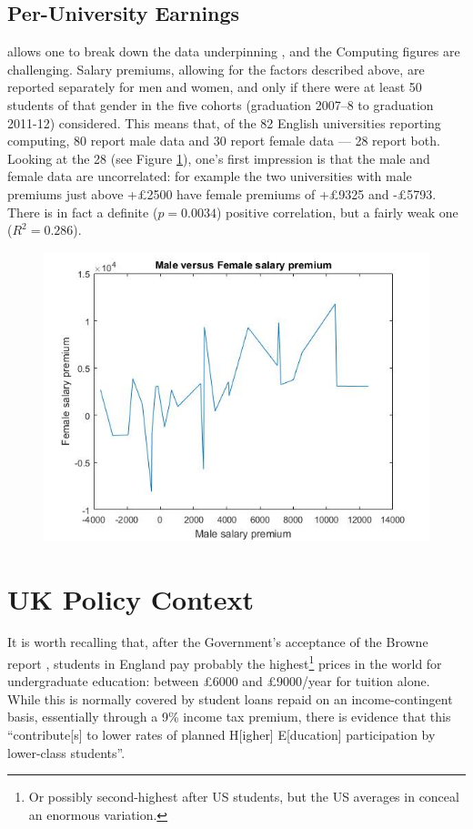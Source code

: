 \documentclass[sigconf]{acmart}
\begin{document}
\subsection{Per-University Earnings}
\cite{BBC2018f} allows one to break down the data underpinning \cite{DfE2018d}, and the Computing figures are challenging.  
Salary premiums, allowing for the factors described above, are reported separately for men and women, and only if there were at least 50 students of that gender in the five cohorts (graduation 2007--8 to graduation 2011-12) considered. This means that, of the 82 English universities reporting computing, 80 report male data and 30 report female data --- 28 report both. Looking at the 28 (see Figure \ref{fig:BBC}), one's first impression is that the male and female data are uncorrelated: for example the two universities with male premiums just above +\pounds2500 have female premiums of +\pounds9325 and -\pounds5793. There is in fact a definite ($p=0.0034$) positive correlation, but a fairly weak one ($R^2=0.286$). 
\begin{figure}\caption{\label{fig:BBC}}
\includegraphics[scale=0.45]{BBCSalaryData.jpg}
\end{figure}

\section{UK Policy Context}
It is worth recalling that, after the Government's acceptance of the Browne report \cite{BIS2010a}, students in England pay probably the highest\footnote{Or possibly second-highest after US students, but the US averages in \cite[Table B5.1]{OECD2016a} conceal an enormous variation.} prices in the world for undergraduate education: between \pounds6000 and \pounds9000/year for tuition alone. While this is normally covered by student loans repaid on an income-contingent basis, essentially through a 9\% income tax premium, there is evidence \cite{CallenderMason2017a} that this ``contribute[s] to lower rates of planned H[igher] E[ducation] participation by lower-class students''.
\end{document}
